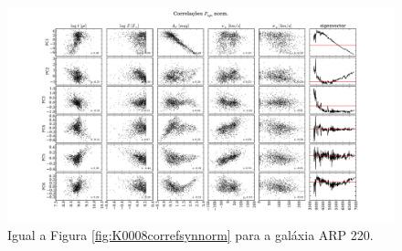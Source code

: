 \begin{figure}
    \includegraphics[width=1.3\textwidth, angle=-90]{figuras/K0802-correl-f_syn_norm-PCvsPhys.pdf}
	\caption[Correlações PCs vs. par\^ametros f\'isicos - $F_{syn}$ norm. - ARP 220.]
	{Igual a Figura \ref{fig:K0008correfsynnorm} para a galáxia ARP 220.}
    \label{fig:K0802correfsynnorm}
\end{figure}

